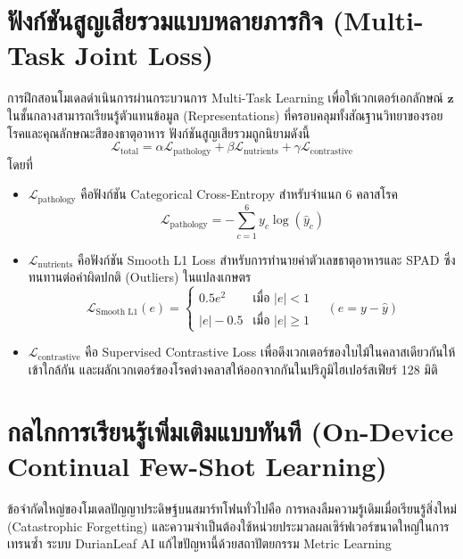 \section{ฟังก์ชันสูญเสียรวมแบบหลายภารกิจ (Multi-Task Joint Loss)}
การฝึกสอนโมเดลดำเนินการผ่านกระบวนการ Multi-Task Learning เพื่อให้เวกเตอร์เอกลักษณ์ $\mathbf{z}$ ในชั้นกลางสามารถเรียนรู้ตัวแทนข้อมูล (Representations) ที่ครอบคลุมทั้งสัณฐานวิทยาของรอยโรคและคุณลักษณะสีของธาตุอาหาร ฟังก์ชันสูญเสียรวมถูกนิยามดังนี้
\begin{equation}
  \mathcal{L}_{\text{total}} = \alpha \mathcal{L}_{\text{pathology}} + \beta \mathcal{L}_{\text{nutrients}} + \gamma \mathcal{L}_{\text{contrastive}}
\end{equation}
โดยที่
\begin{itemize}
  \item $\mathcal{L}_{\text{pathology}}$ คือฟังก์ชัน Categorical Cross-Entropy สำหรับจำแนก 6 คลาสโรค
  \begin{equation}
    \mathcal{L}_{\text{pathology}} = -\sum_{c=1}^{6} y_c \log(\hat{y}_c)
  \end{equation}
  \item $\mathcal{L}_{\text{nutrients}}$ คือฟังก์ชัน Smooth L1 Loss สำหรับการทำนายค่าตัวเลขธาตุอาหารและ SPAD ซึ่งทนทานต่อค่าผิดปกติ (Outliers) ในแปลงเกษตร
  \begin{equation}
    \mathcal{L}_{\text{Smooth L1}}(e) = \begin{cases}
      0.5 e^2 & \text{เมื่อ } |e| < 1 \\
      |e| - 0.5 & \text{เมื่อ } |e| \ge 1
    \end{cases}
    \quad (e = y - \hat{y})
  \end{equation}
  \item $\mathcal{L}_{\text{contrastive}}$ คือ Supervised Contrastive Loss เพื่อดึงเวกเตอร์ของใบไม้ในคลาสเดียวกันให้เข้าใกล้กัน และผลักเวกเตอร์ของโรคต่างคลาสให้ออกจากกันในปริภูมิไฮเปอร์สเฟียร์ 128 มิติ
\end{itemize}

\section{กลไกการเรียนรู้เพิ่มเติมแบบทันที (On-Device Continual Few-Shot Learning)}
ข้อจำกัดใหญ่ของโมเดลปัญญาประดิษฐ์บนสมาร์ทโฟนทั่วไปคือ การหลงลืมความรู้เดิมเมื่อเรียนรู้สิ่งใหม่ (Catastrophic Forgetting) และความจำเป็นต้องใช้หน่วยประมวลผลเซิร์ฟเวอร์ขนาดใหญ่ในการเทรนซ้ำ ระบบ DurianLeaf AI แก้ไขปัญหานี้ด้วยสถาปัตยกรรม Metric Learning

